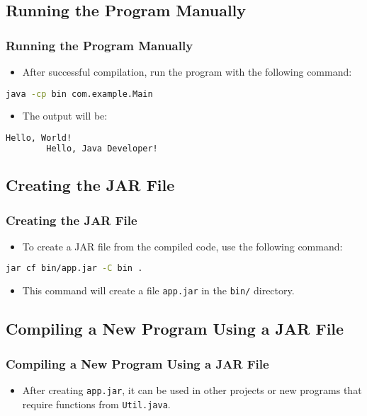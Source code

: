 \documentclass[aspectratio=169, table]{beamer}
\begin{document}
\subsection{Running the Program Manually}

\begin{frame}[fragile]
	\frametitle{Running the Program Manually}
	\begin{itemize}
		\item After successful compilation, run the program with the following command:
	\end{itemize}
	\begin{lstlisting}[language=bash]
		java -cp bin com.example.Main
	\end{lstlisting}
	\begin{itemize}
		\item The output will be:
	\end{itemize}
	\begin{lstlisting}[language=bash]
		Hello, World!
		Hello, Java Developer!
	\end{lstlisting}
\end{frame}

\subsection{Creating the JAR File}

\begin{frame}[fragile]
	\frametitle{Creating the JAR File}
	\begin{itemize}
		\item To create a JAR file from the compiled code, use the following command:
	\end{itemize}
	\begin{lstlisting}[language=bash]
		jar cf bin/app.jar -C bin .
	\end{lstlisting}
	\begin{itemize}
		\item This command will create a file \texttt{app.jar} in the \texttt{bin/} directory.
	\end{itemize}
\end{frame}

\subsection{Compiling a New Program Using a JAR File}

\begin{frame}
	\frametitle{Compiling a New Program Using a JAR File}
	\begin{itemize}
		\item After creating \texttt{app.jar}, it can be used in other projects or new programs that require functions from \texttt{Util.java}.
	\end{itemize}
\end{frame}
\end{document}
